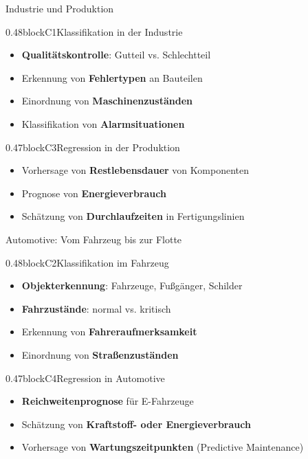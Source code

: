 \begin{frame}{Industrie und Produktion}
\begin{blockrow}
  \begin{blockcol}{0.48\linewidth}{blockC1}{Klassifikation in der Industrie}
    \begin{itemize}
      \item \textbf{Qualitätskontrolle}: Gutteil vs. Schlechtteil
      \item Erkennung von \textbf{Fehlertypen} an Bauteilen
      \item Einordnung von \textbf{Maschinenzuständen}
      \item Klassifikation von \textbf{Alarmsituationen}
    \end{itemize}
  \end{blockcol}

  \begin{blockcol}{0.47\linewidth}{blockC3}{Regression in der Produktion}
    \begin{itemize}
      \item Vorhersage von \textbf{Restlebensdauer} von Komponenten
      \item Prognose von \textbf{Energieverbrauch}
      \item Schätzung von \textbf{Durchlaufzeiten} in Fertigungslinien
    \end{itemize}
  \end{blockcol}
\end{blockrow}
\end{frame}

\begin{frame}{Automotive: Vom Fahrzeug bis zur Flotte}
\begin{blockrow}
  \begin{blockcol}{0.48\linewidth}{blockC2}{Klassifikation im Fahrzeug}
    \begin{itemize}
      \item \textbf{Objekterkennung}: Fahrzeuge, Fußgänger, Schilder
      \item \textbf{Fahrzustände}: normal vs. kritisch
      \item Erkennung von \textbf{Fahreraufmerksamkeit}
      \item Einordnung von \textbf{Straßenzuständen}
    \end{itemize}
  \end{blockcol}

  \begin{blockcol}{0.47\linewidth}{blockC4}{Regression in Automotive}
    \begin{itemize}
      \item \textbf{Reichweitenprognose} für E-Fahrzeuge
      \item Schätzung von \textbf{Kraftstoff- oder Energieverbrauch}
      \item Vorhersage von \textbf{Wartungszeitpunkten} (Predictive Maintenance)
    \end{itemize}
  \end{blockcol}
\end{blockrow}
\end{frame}

